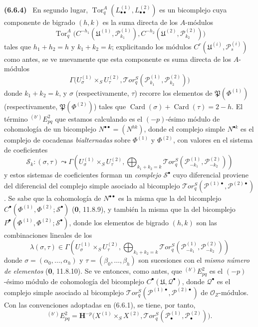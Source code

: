 \documentclass[10pt,oneside]{book}
\newenvironment{env}[1][]{\par\medskip\noindent\textbf{(#1)}\ }{\par}
\begin{document}
\begin{env}[6.6.4]
En segundo lugar,
$\operatorname{Tor}_q^A(L_{\bullet\bullet}^{(1)},L_{\bullet\bullet}^{(2)})$ es un
bicomplejo cuya componente de bigrado $(h,k)$ es la suma directa de los
$A$-módulos
\[
  \operatorname{Tor}_q^A
  \bigl(C^{-h_1}(\mathfrak U^{(1)},\mathscr P_{k_1}^{(1)}),
        C^{-h_2}(\mathfrak U^{(2)},\mathscr P_{k_2}^{(2)})\bigr)
\]
tales que $h_1+h_2=h$ y $k_1+k_2=k$; explicitando los módulos
$C^r(\mathfrak U^{(i)},\mathscr P_s^{(i)})$ como antes, se ve nuevamente que
esta componente es suma directa de los $A$-módulos
\[
  \Gamma\bigl(U_\sigma^{(1)}\times_S U_\tau^{(2)},
    \mathscr{T}\!or_q^S
    (\mathscr P_{k_1}^{(1)},\mathscr P_{k_2}^{(2)})\bigr)
\]
donde $k_1+k_2=k$, y $\sigma$ (respectivamente, $\tau$) recorre los elementos
de $\mathfrak P(\Phi^{(1)})$ (respectivamente,
$\mathfrak P(\Phi^{(2)})$) tales que
$\operatorname{Card}(\sigma)+\operatorname{Card}(\tau)=2-h$. El término
${}^{(b')}E_{pq}^2$ que estamos calculando es el $(-p)$-ésimo módulo
de cohomología de un bicomplejo $N^{\bullet\bullet}=(N^{hk})$, donde el
complejo simple $N^{\bullet k}$ es el complejo de cocadenas \emph{bialternadas} sobre
$\Phi^{(1)}$ y $\Phi^{(2)}$, con valores en el sistema de coeficientes
\[
  \mathscr S_k:(\sigma,\tau)\leadsto
  \Gamma\left(U_\sigma^{(1)}\times_S U_\tau^{(2)},
    \bigoplus_{k_1+k_2=k}
    \mathscr{T}\!or_q^S
    (\mathscr P_{-k_1}^{(1)},\mathscr P_{-k_2}^{(2)})\right)
\]
y estos sistemas de coeficientes forman un \emph{complejo} $\mathscr S^\bullet$ cuyo
diferencial proviene del diferencial del complejo simple asociado al bicomplejo
$\mathscr{T}\!or_q^S
(\mathscr P^{(1)\bullet},\mathscr P^{(2)\bullet})$. Se sabe que la
cohomología de $N^{\bullet\bullet}$ es la misma que la del bicomplejo
$C^\bullet(\Phi^{(1)},\Phi^{(2)};\mathscr S^\bullet)$
(\textbf{0}, 11.8.9), y también la misma que la del bicomplejo
$P^\bullet(\Phi^{(1)},\Phi^{(2)};\mathscr S^\bullet)$, donde los elementos de
bigrado $(h,k)$ son las combinaciones lineales de los
\[
  \lambda(\sigma,\tau)\in
  \Gamma\left(U_\sigma^{(1)}\times_S U_\tau^{(2)},
    \bigoplus_{k_1+k_2=k}
    \mathscr{T}\!or_q^S
    (\mathscr P_{-k_1}^{(1)},\mathscr P_{-k_2}^{(2)})\right)
\]
donde $\sigma=(\alpha_0,\ldots,\alpha_h)$ y
$\tau=(\beta_0,\ldots,\beta_h)$ son sucesiones con el \emph{mismo número de
elementos} (\textbf{0}, 11.8.10). Se ve entonces, como antes, que
${}^{(b')}E_{pq}^2$ es el $(-p)$-ésimo módulo de cohomología del
bicomplejo $C^\bullet(\mathfrak U,\mathscr Q^\bullet)$, donde
$\mathscr Q^\bullet$ es el complejo simple asociado al bicomplejo
$\mathscr{T}\!or_q^S
(\mathscr P^{(1)\bullet},\mathscr P^{(2)\bullet})$ de
$\mathscr O_Z$-módulos. Con las convenciones adoptadas en (6.6.1), se tiene,
por tanto,
\[
  {}^{(b')}E_{pq}^2
  =\mathbf H^{-p}\bigl(X^{(1)}\times_S X^{(2)},
    \mathscr{T}\!or_q^S
    (\mathscr P_\bullet^{(1)},\mathscr P_\bullet^{(2)})\bigr).
\]
\end{env}
\end{document}
